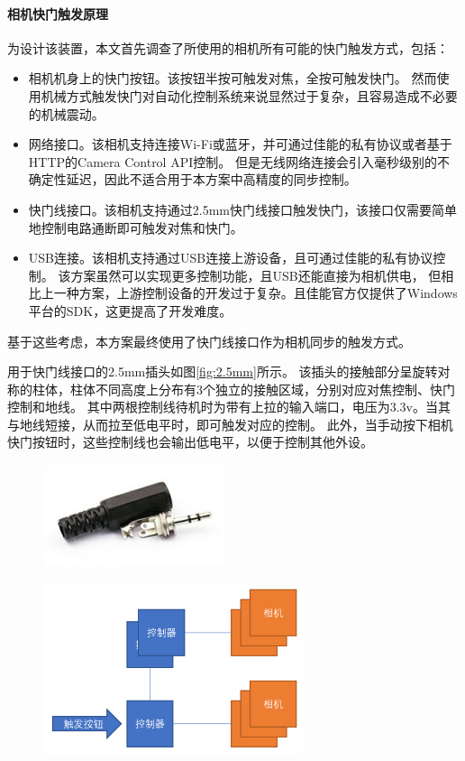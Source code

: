 \paragraph{相机快门触发原理}

为设计该装置，本文首先调查了所使用的相机所有可能的快门触发方式，包括：
\begin{itemize}
\item 相机机身上的快门按钮。该按钮半按可触发对焦，全按可触发快门。
然而使用机械方式触发快门对自动化控制系统来说显然过于复杂，且容易造成不必要的机械震动。
\item 网络接口。该相机支持连接Wi-Fi或蓝牙，并可通过佳能的私有协议或者基于HTTP的Camera Control API控制。
但是无线网络连接会引入毫秒级别的不确定性延迟，因此不适合用于本方案中高精度的同步控制。
\item 快门线接口。该相机支持通过2.5mm快门线接口触发快门，该接口仅需要简单地控制电路通断即可触发对焦和快门。
\item USB连接。该相机支持通过USB连接上游设备，且可通过佳能的私有协议控制。
该方案虽然可以实现更多控制功能，且USB还能直接为相机供电，
但相比上一种方案，上游控制设备的开发过于复杂。且佳能官方仅提供了Windows平台的SDK，这更提高了开发难度。
\end{itemize}
基于这些考虑，本方案最终使用了快门线接口作为相机同步的触发方式。

用于快门线接口的2.5mm插头如图\ref{fig:2.5mm}所示。
该插头的接触部分呈旋转对称的柱体，柱体不同高度上分布有3个独立的接触区域，分别对应对焦控制、快门控制和地线。
其中两根控制线待机时为带有上拉的输入端口，电压为3.3v。当其与地线短接，从而拉至低电平时，即可触发对应的控制。
此外，当手动按下相机快门按钮时，这些控制线也会输出低电平，以便于控制其他外设。

\begin{figure}
\centering
\begin{minipage}{.5\textwidth}
    \centering
    \includegraphics[height=3cm]{figures/2.5mm}
    \label{fig:2.5mm}
\end{minipage}%
\begin{minipage}{.5\textwidth}
    \centering
    \includegraphics[height=5cm]{figures/passive_sync_topo}
    \label{fig:passive_sync_topo}
\end{minipage}%
\end{figure}


